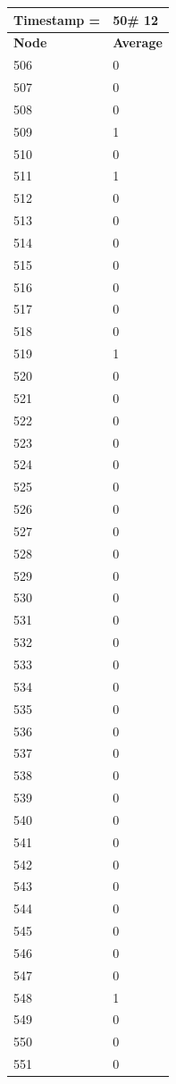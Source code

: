 \begin{tabular}{|l||l|}
\hline
\textbf{Timestamp =} & \textbf{50}\# 12\\\hline
	\textbf{Node} & \textbf{Average} \\ \hline
\hline
	506 & 0 \\ \hline
	507 & 0 \\ \hline
	508 & 0 \\ \hline
	509 & 1 \\ \hline
	510 & 0 \\ \hline
	511 & 1 \\ \hline
	512 & 0 \\ \hline
	513 & 0 \\ \hline
	514 & 0 \\ \hline
	515 & 0 \\ \hline
	516 & 0 \\ \hline
	517 & 0 \\ \hline
	518 & 0 \\ \hline
	519 & 1 \\ \hline
	520 & 0 \\ \hline
	521 & 0 \\ \hline
	522 & 0 \\ \hline
	523 & 0 \\ \hline
	524 & 0 \\ \hline
	525 & 0 \\ \hline
	526 & 0 \\ \hline
	527 & 0 \\ \hline
	528 & 0 \\ \hline
	529 & 0 \\ \hline
	530 & 0 \\ \hline
	531 & 0 \\ \hline
	532 & 0 \\ \hline
	533 & 0 \\ \hline
	534 & 0 \\ \hline
	535 & 0 \\ \hline
	536 & 0 \\ \hline
	537 & 0 \\ \hline
	538 & 0 \\ \hline
	539 & 0 \\ \hline
	540 & 0 \\ \hline
	541 & 0 \\ \hline
	542 & 0 \\ \hline
	543 & 0 \\ \hline
	544 & 0 \\ \hline
	545 & 0 \\ \hline
	546 & 0 \\ \hline
	547 & 0 \\ \hline
	548 & 1 \\ \hline
	549 & 0 \\ \hline
	550 & 0 \\ \hline
	551 & 0 \\ \hline
\end{tabular}

